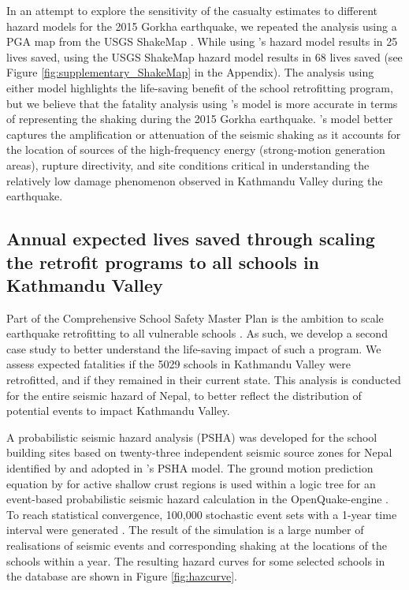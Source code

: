 In an attempt to explore the sensitivity of the casualty estimates to different hazard models for the 2015 Gorkha earthquake, we repeated the analysis using a PGA map from the USGS ShakeMap \citep{shakemap2015nepal, wald2007topographic}. While using \cite{chen20192015}'s hazard model results in 25 lives saved, using the USGS ShakeMap hazard model results in 68 lives saved (see Figure \ref{fig:supplementary_ShakeMap} in the Appendix).  The analysis using either model highlights the life-saving benefit of the school retrofitting program, but we believe that the fatality analysis using \cite{chen20192015}'s model is more accurate in terms of representing the shaking during the 2015 Gorkha earthquake. \cite{chen20192015}'s model better captures the amplification or attenuation of the seismic shaking as it accounts for the location of sources of the high-frequency energy (strong-motion generation areas), rupture directivity, and site conditions critical in understanding the relatively low damage phenomenon observed in Kathmandu Valley during the earthquake. 

\vspace{0.5cm} %

\subsection{Annual expected lives saved through scaling the retrofit programs to all schools in Kathmandu Valley}
\label{section-case2}

Part of the Comprehensive School Safety Master Plan is the ambition to scale earthquake retrofitting to all vulnerable schools \citep{cehrdc2018}. As such, we develop a second case study to better understand the life-saving impact of such a program. We assess expected fatalities if the 5029 schools in Kathmandu Valley were retrofitted, and if they remained in their current state. This analysis is conducted for the entire seismic hazard of Nepal, to better reflect the distribution of potential events to impact Kathmandu Valley.

A probabilistic seismic hazard analysis (PSHA) was developed for the school building sites based on twenty-three independent seismic source zones for Nepal identified by \cite{ram2013probabilistic} and adopted in \cite{chaulagain2015seismic}’s PSHA model. The ground motion prediction equation by \cite{chiou2014update} for active shallow crust regions is used within a logic tree for an event-based probabilistic seismic hazard calculation in the OpenQuake-engine \citep{silva2014development}. To reach statistical convergence, 100,000 stochastic event sets with a 1-year time interval were generated \citep{silva2016critical}. The result of the simulation is a large number of realisations of seismic events and corresponding shaking at the locations of the schools within a year. The resulting hazard curves for some selected schools in the database are shown in Figure \ref{fig:hazcurve}.

